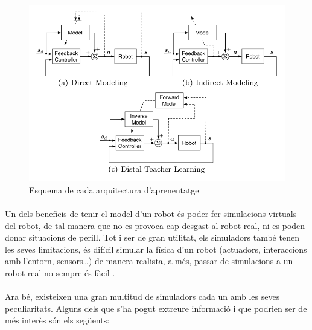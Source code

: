 \documentclass[12pt,a4paper,final,twoside]{article}
\begin{document}
\begin{figure}[h]
\begin{center}
\includegraphics[scale=0.4]{Imatges/arquitectures-d'aprenentatge.png}
\caption{Esquema de cada arquitectura d'aprenentatge \cite{Nguyen-Tuong2011}}
\end{center}
\end{figure}


\paragraph{}Un dels beneficis de tenir el model d'un robot és poder fer simulacions virtuals del robot, de tal manera que no es provoca cap desgast al robot real, ni es poden donar situacions de perill. Tot i ser de gran utilitat, els simuladors també tenen les seves limitacions, és difícil simular la física d'un robot (actuadors, interaccions amb l'entorn, sensors\dots) de manera realista, a més, passar de simulacions a un robot real no sempre és fàcil \cite{Hohl2006}.

\paragraph{}Ara bé, existeixen una gran multitud de simuladors cada un amb les seves peculiaritats. Alguns dels que s'ha pogut extreure informació i que podrien ser de més interès són els següents:
\end{document}

